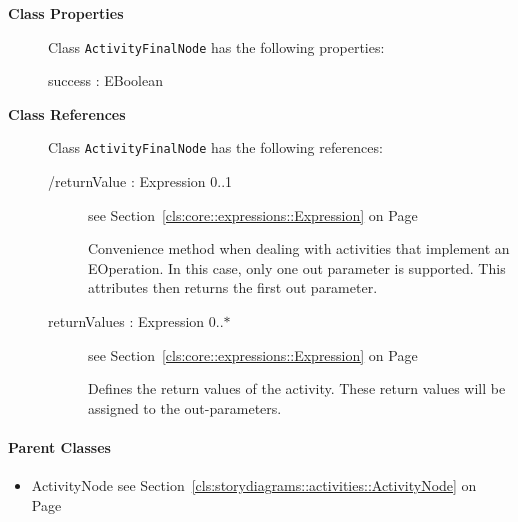 \begin{description}

	\item[\textbf{Class Properties}] Class \texttt{ActivityFinalNode} has the following properties:
	\begin{description}
\item[success : EBoolean 	]

\hspace{\fill}
\nopagebreak


	
	\end{description}
	
	\item[\textbf{Class References}] Class \texttt{ActivityFinalNode} has the following references:
	\begin{description}
\item[/returnValue : Expression 			0..1]
see Section~\ref{cls:core::expressions::Expression} on Page~\pageref{cls:core::expressions::Expression}
\hspace{\fill}
\nopagebreak


	
			
Convenience method when dealing with activities that implement an EOperation. In this case, only one out parameter is supported. This attributes then returns the first out parameter.	
		
	
\item[returnValues : Expression 			0..$*$]
see Section~\ref{cls:core::expressions::Expression} on Page~\pageref{cls:core::expressions::Expression}
\hspace{\fill}
\nopagebreak


	
			
Defines the return values of the activity. These return values will be assigned to the out-parameters.	
		
	
	\end{description}
	

\end{description}

\paragraph{Parent Classes}
\begin{itemize}
\item ActivityNode see Section~\ref{cls:storydiagrams::activities::ActivityNode} on Page~\pageref{cls:storydiagrams::activities::ActivityNode}\end{itemize}
